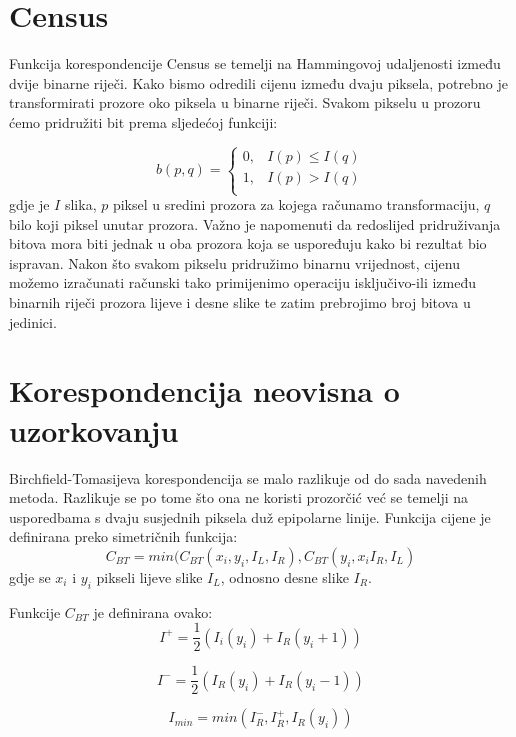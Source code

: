 \documentclass[utf8, zavrsni, numeric]{fer}
\begin{document}
\section{Census}

Funkcija korespondencije Census se temelji na Hammingovoj udaljenosti između dvije binarne riječi. Kako bismo odredili cijenu između dvaju piksela, potrebno je transformirati
prozore oko piksela u binarne riječi. Svakom pikselu u prozoru ćemo pridružiti bit prema sljedećoj funkciji:

\[   
b(p, q) = 
     \begin{cases}
       0, & I(p) \leq I(q) \\
       1, & I(p) > I(q) \\
     \end{cases}
\]
gdje je $I$ slika, $p$ piksel u sredini prozora za kojega računamo transformaciju, $q$ bilo koji piksel unutar prozora. Važno je napomenuti da redoslijed pridruživanja bitova mora biti jednak u oba
prozora koja se uspoređuju kako bi rezultat bio ispravan. Nakon što svakom pikselu pridružimo binarnu vrijednost, cijenu možemo izračunati
računski tako primijenimo operaciju isključivo-ili između binarnih riječi prozora lijeve i desne slike te zatim prebrojimo broj bitova u jedinici.

\section{Korespondencija neovisna o uzorkovanju}

Birchfield-Tomasijeva korespondencija se malo razlikuje od do sada navedenih metoda. Razlikuje se po tome što ona ne koristi prozorčić već se temelji na usporedbama s dvaju susjednih piksela duž epipolarne linije.
Funkcija cijene je definirana preko simetričnih funkcija:
$$ C_{BT} = min(C_{BT}(x_i, y_i, I_L, I_R), C_{BT}(y_i, x_i I_R, I_L) $$
gdje se $x_i$ i $y_i$ pikseli lijeve slike $I_L$, odnosno desne slike $I_R$.

Funkcije $C_{BT}$ je definirana ovako:
\begin{equation}
I^+ = \frac{1}{2}(I_i(y_i) + I_R(y_i + 1))
\end{equation}

\begin{equation}
I^- = \frac{1}{2}(I_R(y_i) + I_R(y_i - 1))
\end{equation}

\begin{equation}
I_{min} = min(I^-_R, I^+_R, I_R(y_i))
\end{equation}
\end{document}
